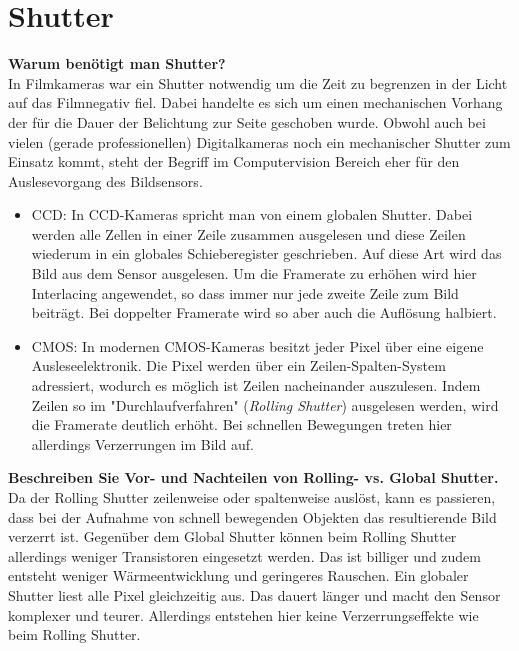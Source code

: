 \documentclass[a4paper]{article}
\begin{document}
	
	\section{Shutter}
	\textbf{Warum benötigt man Shutter?}\\
	In Filmkameras war ein Shutter notwendig um die Zeit zu begrenzen in der Licht auf das Filmnegativ fiel. Dabei handelte es sich um einen mechanischen Vorhang der für die Dauer der Belichtung zur Seite geschoben wurde. Obwohl auch bei vielen (gerade professionellen) Digitalkameras noch ein mechanischer Shutter zum Einsatz kommt, steht der Begriff im Computervision Bereich eher für den Auslesevorgang des Bildsensors.
	\begin{itemize}
		\item CCD: In CCD-Kameras spricht man von einem globalen Shutter. Dabei werden alle Zellen in einer Zeile zusammen ausgelesen und diese Zeilen wiederum in ein globales Schieberegister geschrieben. Auf diese Art wird das Bild aus dem Sensor ausgelesen. Um die Framerate zu erhöhen wird hier Interlacing angewendet, so dass immer nur jede zweite Zeile zum Bild beiträgt. Bei doppelter Framerate wird so aber auch die Auflösung halbiert.
		\item CMOS: In modernen CMOS-Kameras besitzt jeder Pixel über eine eigene Ausleseelektronik. Die Pixel werden über ein Zeilen-Spalten-System adressiert, wodurch es möglich ist Zeilen nacheinander auszulesen. Indem Zeilen so im "Durchlaufverfahren" (\textit{Rolling Shutter}) ausgelesen werden, wird die Framerate deutlich erhöht. Bei schnellen Bewegungen treten hier allerdings Verzerrungen im Bild auf.
	\end{itemize}
	\newpage
	\noindent
	\textbf{Beschreiben Sie Vor- und Nachteilen von Rolling- vs. Global Shutter.}\\
	Da der Rolling Shutter zeilenweise oder spaltenweise auslöst, kann es passieren, dass bei der Aufnahme von schnell bewegenden Objekten das resultierende Bild verzerrt ist. Gegenüber dem Global Shutter können beim Rolling Shutter allerdings weniger Transistoren eingesetzt werden. Das ist billiger und zudem entsteht weniger Wärmeentwicklung und geringeres Rauschen. Ein globaler Shutter liest alle Pixel gleichzeitig aus. Das dauert länger und macht den Sensor komplexer und teurer. Allerdings entstehen hier keine Verzerrungseffekte wie beim Rolling Shutter. 
\end{document}
